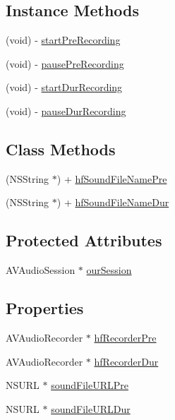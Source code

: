 \subsection*{Instance Methods}
\begin{DoxyCompactItemize}
\item 
(void) -\/ \hyperlink{interface_e_s___sound_wave_processor_ab93047d23cbd7dfc3fc8adc1889f91c8}{start\+Pre\+Recording}
\item 
(void) -\/ \hyperlink{interface_e_s___sound_wave_processor_a47c25f7b1cd266081318110842a520c2}{pause\+Pre\+Recording}
\item 
(void) -\/ \hyperlink{interface_e_s___sound_wave_processor_a3b2b657c15a71a13b739243c124f59d7}{start\+Dur\+Recording}
\item 
(void) -\/ \hyperlink{interface_e_s___sound_wave_processor_ac32f93c69662660df7a3c107a7cae468}{pause\+Dur\+Recording}
\end{DoxyCompactItemize}
\subsection*{Class Methods}
\begin{DoxyCompactItemize}
\item 
(N\+S\+String $\ast$) + \hyperlink{interface_e_s___sound_wave_processor_a5d59c5907105ec1c5534dbdfe2fd0d2d}{hf\+Sound\+File\+Name\+Pre}
\item 
(N\+S\+String $\ast$) + \hyperlink{interface_e_s___sound_wave_processor_aa5462a874ee4c55c2ef3f79aa5056ef4}{hf\+Sound\+File\+Name\+Dur}
\end{DoxyCompactItemize}
\subsection*{Protected Attributes}
\begin{DoxyCompactItemize}
\item 
A\+V\+Audio\+Session $\ast$ \hyperlink{interface_e_s___sound_wave_processor_a029e97ffd5fcd9fe9c92e8e661dce50a}{our\+Session}
\end{DoxyCompactItemize}
\subsection*{Properties}
\begin{DoxyCompactItemize}
\item 
A\+V\+Audio\+Recorder $\ast$ \hyperlink{interface_e_s___sound_wave_processor_a51e8dbca07474e0a33c8271d609755d9}{hf\+Recorder\+Pre}
\item 
A\+V\+Audio\+Recorder $\ast$ \hyperlink{interface_e_s___sound_wave_processor_a2400b027a3620b00f5acd052ab017f2c}{hf\+Recorder\+Dur}
\item 
N\+S\+U\+R\+L $\ast$ \hyperlink{interface_e_s___sound_wave_processor_aea7305ff1e749b26cd9af36ab1965610}{sound\+File\+U\+R\+L\+Pre}
\item 
N\+S\+U\+R\+L $\ast$ \hyperlink{interface_e_s___sound_wave_processor_a6690d478507657e282ff8cc3d6941502}{sound\+File\+U\+R\+L\+Dur}
\end{DoxyCompactItemize}


